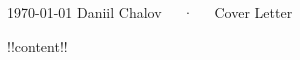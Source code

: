 \documentclass[11pt, a4paper]{awesome-cv}
\begin{document}
\makecvheader[R]

\makecvfooter
{\today}
{Daniil Chalov~~~·~~~Cover Letter}
{\thepage}

\makelettertitle

\begin{cvletter}

	!!content!!

\end{cvletter}


\makeletterclosing
\end{document}
